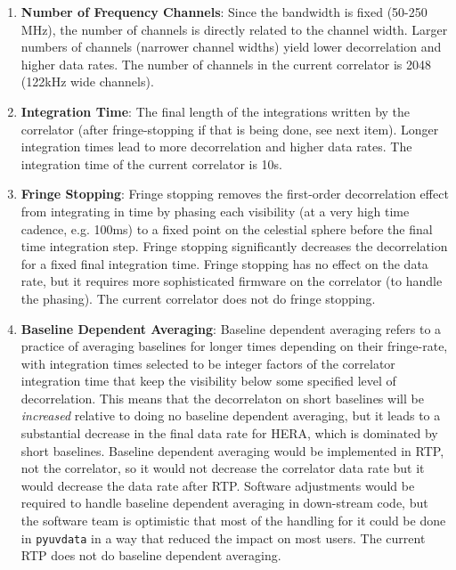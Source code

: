 \documentclass{article}
\begin{document}
\begin{enumerate}
\item \textbf{Number of Frequency Channels}: Since the bandwidth is fixed (50-250 MHz), the number of channels is directly related to the channel 
width. Larger numbers of channels (narrower channel widths) yield lower decorrelation and higher data rates. The number of channels in the current 
correlator is 2048 (122kHz wide channels).
\item \textbf{Integration Time}: The final length of the integrations written by the correlator (after fringe-stopping if that is being done, see next item). 
Longer integration times lead to more decorrelation and higher data rates. The integration time of the current correlator is 10s.
\item \textbf{Fringe Stopping}: Fringe stopping removes the first-order decorrelation effect from integrating in time by phasing each visibility (at a very 
high time cadence, e.g. 100ms) to a fixed point on the celestial sphere before the final time integration step. Fringe stopping significantly decreases 
the decorrelation for a fixed final integration time. Fringe stopping has no effect on the data rate, but it requires more sophisticated firmware on the 
correlator (to handle the phasing). The current correlator does not do fringe stopping.
\item \textbf{Baseline Dependent Averaging}: Baseline dependent averaging refers to a practice of averaging baselines for longer times depending on 
their fringe-rate, with integration times selected to be integer factors of the correlator integration time that keep the visibility below some specified 
level of decorrelation. This means that the decorrelaton on short baselines will be \textit{increased} relative to doing no baseline dependent 
averaging, but it leads to a substantial decrease in the final data rate for HERA, which is dominated by short baselines. Baseline dependent 
averaging would be implemented in RTP, not the correlator, so it would not decrease the correlator data rate but it would decrease the data rate after 
RTP. Software adjustments would be required to handle baseline dependent averaging in down-stream code, but the software team is optimistic that 
most of the handling for it could be done in \texttt{pyuvdata} in a way that reduced the impact on most users. The current RTP does not do baseline 
dependent averaging.
\end{enumerate}
\end{document}
